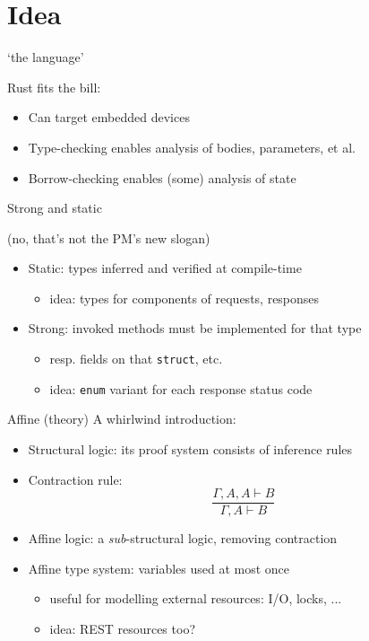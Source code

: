 \documentclass[10pt]{beamer}
\begin{document}
\section[Idea: bring REST semantics `into' the (client) language]{Idea}

\begin{frame}{`the language'}

    Rust fits the bill\pause:
    \begin{itemize}[<+->]
		\item Can target embedded devices
		\item Type-checking enables analysis of bodies, parameters, et al.
		\item Borrow-checking enables (some) analysis of state
	\end{itemize}

\end{frame}

\begin{frame}{Strong and static
    \begin{footnotesize}(no, that's not the PM's new slogan)\end{footnotesize}
}

    \begin{itemize}[<+->]
		\item Static: types inferred and verified at compile-time
		\begin{itemize}
		    \item \alert{idea}: types for components of requests, responses
		\end{itemize}
		\item Strong: invoked methods must be implemented for that type
		\begin{itemize}
		    \item resp. fields on that \texttt{struct}, etc.
		    \item \alert{idea}: \texttt{enum} variant for each response status code
		\end{itemize}
	\end{itemize}
\end{frame}

\begin{frame}{Affine (theory)}
    A whirlwind introduction\pause:
    \begin{itemize}[<+->]
		\item Structural logic: its proof system consists of inference rules
		\item Contraction rule: \[
		    \dfrac{\Gamma, A, A \vdash B}{\Gamma, A \vdash B}
		\]
		\item Affine logic: a \emph{sub}-structural logic, removing contraction
		\item Affine type system: variables used at most once
		\begin{itemize}
		    \item useful for modelling external resources: I/O, locks, ...
		    \item \alert{idea}: REST resources too?
		\end{itemize}
	\end{itemize}
\end{frame}
\end{document}
